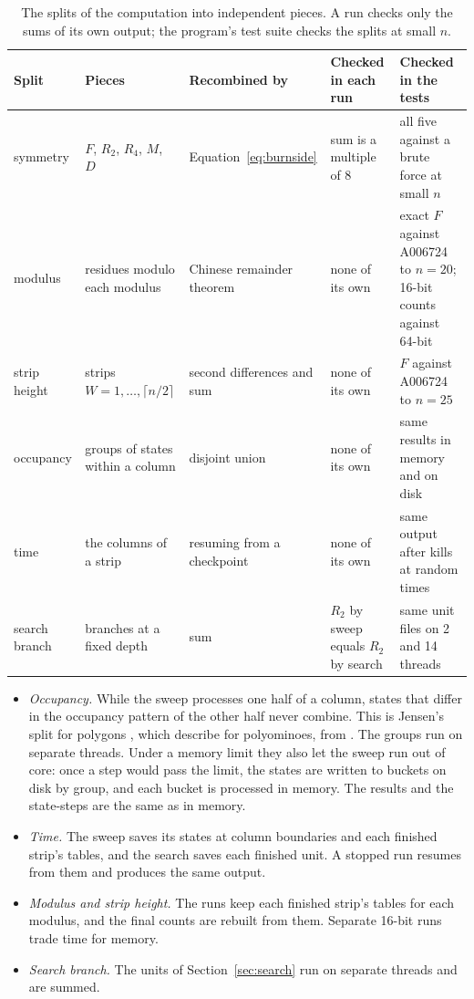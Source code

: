 \documentclass[11pt]{a000104}
\numberwithin{equation}{section}
\begin{document}
\begin{table}[!htbp]
  \centering
  \small
  \begin{tabularx}{\textwidth}{>{\raggedright\arraybackslash}p{1.8cm}>{\raggedright\arraybackslash}X>{\raggedright\arraybackslash}X>{\raggedright\arraybackslash}X>{\raggedright\arraybackslash}X}
    \toprule
    Split & Pieces & Recombined by & Checked in each run & Checked in the tests \\
    \midrule
    symmetry & $F$, $R_2$, $R_4$, $M$, $D$ & Equation~\eqref{eq:burnside} & sum is a multiple of 8 & all five against a brute force at small $n$ \\
    modulus & residues modulo each modulus & Chinese remainder theorem & none of its own & exact $F$ against A006724 to $n = 20$; 16-bit counts against 64-bit \\
    strip height & strips $W = 1, \ldots, \lceil n/2 \rceil$ & second differences and sum & none of its own & $F$ against A006724 to $n = 25$ \\
    occupancy & groups of states within a column & disjoint union & none of its own & same results in memory and on disk \\
    time & the columns of a strip & resuming from a checkpoint & none of its own & same output after kills at random times \\
    search branch & branches at a fixed depth & sum & $R_2$ by sweep equals $R_2$ by search & same unit files on 2 and 14 threads \\
    \bottomrule
  \end{tabularx}
  \caption{The splits of the computation into independent pieces. A run checks only the sums of its own output; the program's test suite checks the splits at small $n$.}
  \label{tab:pieces}
\end{table}

\begin{itemize}
  \item \emph{Occupancy.} While the sweep processes one half of a column, states that differ in the occupancy pattern of the other half never combine. This is Jensen's split for polygons \parencite[Sect.~2.2]{JensenPolygons:2003}, which \textcite[Sect.~4.4]{BarequetBenShachar:2026} describe for polyominoes, from \textcite{Jensen:2003}. The groups run on separate threads. Under a memory limit they also let the sweep run out of core: once a step would pass the limit, the states are written to buckets on disk by group, and each bucket is processed in memory. The results and the state-steps are the same as in memory.
  \item \emph{Time.} The sweep saves its states at column boundaries and each finished strip's tables, and the search saves each finished unit. A stopped run resumes from them and produces the same output.
  \item \emph{Modulus and strip height.} The runs keep each finished strip's tables for each modulus, and the final counts are rebuilt from them. Separate 16-bit runs trade time for memory.
  \item \emph{Search branch.} The units of Section~\ref{sec:search} run on separate threads and are summed.
\end{itemize}
\end{document}
